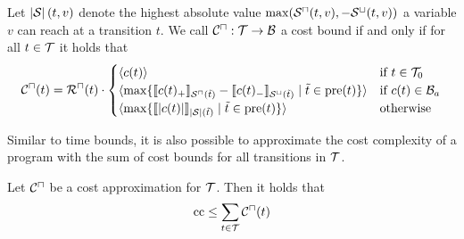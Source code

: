 \begin{definition}
  Let $\left|\mathcal{S}\right|(t, v)$ denote the highest absolute value $\max({\mathcal{S}^\sqcap}(t, v), -{\mathcal{S}^\sqcup}(t, v))$ a variable $v$ can reach at a transition $t$.
  We call ${\mathcal{C}^\sqcap}: \mathcal{T} \rightarrow \mathcal{B}$ a cost bound if and only if for all $t \in \mathcal{T}$ it holds that
  \[ {\mathcal{C}^\sqcap}(t) = {\mathcal{R}^\sqcap}(t) \cdot
  \begin{cases}
    \langle c(t)\rangle & \text{if } t \in \mathcal{T}_0 \\
    \langle\max \lbrace \llbracket c(t)_+ \rrbracket_{{\mathcal{S}^\sqcap}(\tilde{t})} - \llbracket c(t)_- \rrbracket_{{\mathcal{S}^\sqcup}(\tilde{t})} \mid \tilde{t} \in \text{pre}(t) \rbrace\rangle & \text{if } c(t) \in \mathcal{B}_a \\
    \langle\max \lbrace \llbracket \left|c(t)\right| \rrbracket_{\left|\mathcal{S}\right|(\tilde{t})} \mid \tilde{t} \in \text{pre}(t) \rbrace\rangle & \text{otherwise} \\
  \end{cases}
  \]
\end{definition}

Similar to time bounds, it is also possible to approximate the cost complexity of a program with the sum of cost bounds for all transitions in $\mathcal{T}$.

\begin{theorem}
	Let ${\mathcal{C}^\sqcap}$ be a cost approximation for $\mathcal{T}$.
	Then it holds that 
	\[ \text{cc} \leq \sum_{t \in \mathcal{T}} {\mathcal{C}^\sqcap}(t) \]
\end{theorem}

